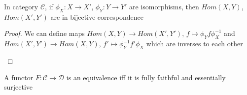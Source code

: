 \documentclass[../main.tex]{subfiles}
\begin{document}
\begin{lemma}\label{X1,X2 iso and Y1,Y2 iso implies Hom(X1,Y1),Hom(X2,Y2) iso}
In category $\mathscr C$, if $\phi_X:X\to X'$, $\phi_Y:Y\to Y'$ are isomorphisms, then $Hom(X,Y)$, $Hom(X',Y')$ are in bijective correspondence
\end{lemma}

\begin{proof}
We can define maps $Hom(X,Y)\to Hom(X',Y')$, $f\mapsto\phi_Y f\phi_X^{-1}$ and $Hom(X',Y')\to Hom(X,Y)$, $f'\mapsto\phi_Y^{-1}f'\phi_X$ which are inverses to each other
\begin{center}
\end{center}
\end{proof}

\begin{theorem}\label{A functor F is an equivalence iff it is fully faithful and essentially surjective}
A functor $F:\mathscr C\to\mathscr D$ is an equivalence iff it is fully faithful and essentially surjective
\end{theorem}
\end{document}
